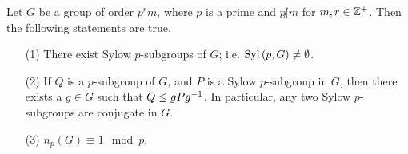 \begin{theorem}\label{4.5.2}
    Let $G$ be a group of order  $p^rm$, where  $p$ is a prime and  $p \not| m$
    for  $m,r \in \mathbb{Z}^+$. Then the following statements are true.
    \begin{enumerate}
        \item[(1)] There exist Sylow $p$-subgroups of $G$; i.e. $\operatorname{Syl}{(p,G)}
            \neq \emptyset$.

        \item[(2)] If $Q$ is a  $p$-subgroup of $G$, and $P$ is a Sylow
            $p$-subgroup in $G$, then there exists a $g \in G$ such that $Q \leq
            gPg^{-1}$. In particular, any two Sylow $p$-subgroups are conjugate
            in $G$.

        \item[(3)] $n_p(G) \equiv 1 \mod{p}$.
    \end{enumerate}
\end{theorem}

